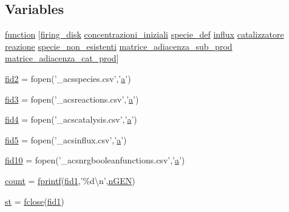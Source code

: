\subsection*{Variables}
\begin{DoxyCompactItemize}
\item 
\hyperlink{a00110_a4b4c670b101bf7a838f775e008fa6255}{function} \mbox{[}\hyperlink{a00103_acb72987b5000cf59c6f81c482e2ac8ac}{firing\+\_\+disk} \hyperlink{a00103_a89801fa89eee3ba40f6610f290d6f6c3}{concentrazioni\+\_\+iniziali} \hyperlink{a00110_a85d979dc881d9a49537b0f43daa2b360}{specie\+\_\+def} \hyperlink{a00107_a902e747aeec6b345d3a057099152f41f}{influx} \hyperlink{a00102_a14959eaa108dcffcec704a207775f7e8}{catalizzatore} \hyperlink{a00110_a65cf6e12ba9a8c10222f3f1f71f7c95f}{reazione} \hyperlink{a00110_adfcfd2749a68fa87ece8ec3caa194b3d}{specie\+\_\+non\+\_\+esistenti} \hyperlink{a00104_a3568a7566d3871de5460f8fe96044c26}{matrice\+\_\+adiacenza\+\_\+sub\+\_\+prod} \hyperlink{a00104_a23c87a364bec91d4eb554b9eabe0b767}{matrice\+\_\+adiacenza\+\_\+cat\+\_\+prod}\mbox{]}
\item 
\hyperlink{a00110_a11af2c31c7926441f43875d99b4577d2}{fid2} = fopen('\+\_\+acsspecies.\+csv','\hyperlink{a00035_a2ffdbad9ea59541e59cbd2b938e0770c}{a}')
\item 
\hyperlink{a00110_a153e3250d4161f9bea4c140498016d94}{fid3} = fopen('\+\_\+acsreactions.\+csv','\hyperlink{a00035_a2ffdbad9ea59541e59cbd2b938e0770c}{a}')
\item 
\hyperlink{a00110_a28f0b3b80ef3c84a4a00660a307d2147}{fid4} = fopen('\+\_\+acscatalysis.\+csv','\hyperlink{a00035_a2ffdbad9ea59541e59cbd2b938e0770c}{a}')
\item 
\hyperlink{a00110_af5f7ad66ed343bca8289a4d44dbff04f}{fid5} = fopen('\+\_\+acsinflux.\+csv','\hyperlink{a00035_a2ffdbad9ea59541e59cbd2b938e0770c}{a}')
\item 
\hyperlink{a00110_aadad4fd2d661ea2b9f0c3a95e3f7b4ba}{fid10} = fopen('\+\_\+acsnrgbooleanfunctions.\+csv','\hyperlink{a00035_a2ffdbad9ea59541e59cbd2b938e0770c}{a}')
\item 
\hyperlink{a00110_aa0a4866d2600caeb20cfacee8eefc922}{count} = \hyperlink{a00110_aa6dc40efe43a338c9ff278260d95b4d9}{fprintf}(\hyperlink{a00028_ae941ef58ebac7f05a8095badde51c07b}{fid1},'\%d\textbackslash{}n',\hyperlink{a00113_a4c8fe523edbe179c5d215da13f469f72}{n\+G\+E\+N})
\item 
\hyperlink{a00110_afbed6b4ecdae7969c5b47d7d4e71495f}{st} = \hyperlink{a00033_a66a54a4db5a27a03991b5f3034bbc6a4}{fclose}(\hyperlink{a00028_ae941ef58ebac7f05a8095badde51c07b}{fid1})

\end{DoxyCompactItemize}
